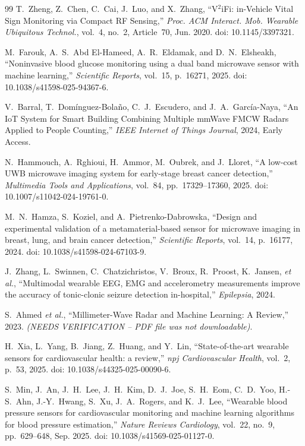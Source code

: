 \begin{thebibliography}{99}
T.~Zheng, Z.~Chen, C.~Cai, J.~Luo, and X.~Zhang, ``V$^2$iFi: in-Vehicle Vital Sign Monitoring via Compact RF Sensing,'' \textit{Proc. ACM Interact. Mob. Wearable Ubiquitous Technol.}, vol.~4, no.~2, Article~70, Jun. 2020. doi: 10.1145/3397321.

M.~Farouk, A.~S.~Abd El-Hameed, A.~R.~Eldamak, and D.~N.~Elsheakh, ``Noninvasive blood glucose monitoring using a dual band microwave sensor with machine learning,'' \textit{Scientific Reports}, vol.~15, p.~16271, 2025. doi: 10.1038/s41598-025-94367-6.

V.~Barral, T.~Dom\'{i}nguez-Bola\~{n}o, C.~J.~Escudero, and J.~A.~Garc\'{i}a-Naya, ``An IoT System for Smart Building Combining Multiple mmWave FMCW Radars Applied to People Counting,'' \textit{IEEE Internet of Things Journal}, 2024, Early Access.

N.~Hammouch, A.~Rghioui, H.~Ammor, M.~Oubrek, and J.~Lloret, ``A low-cost UWB microwave imaging system for early-stage breast cancer detection,'' \textit{Multimedia Tools and Applications}, vol.~84, pp.~17329--17360, 2025. doi: 10.1007/s11042-024-19761-0.

M.~N.~Hamza, S.~Koziel, and A.~Pietrenko-Dabrowska, ``Design and experimental validation of a metamaterial-based sensor for microwave imaging in breast, lung, and brain cancer detection,'' \textit{Scientific Reports}, vol.~14, p.~16177, 2024. doi: 10.1038/s41598-024-67103-9.

J.~Zhang, L.~Swinnen, C.~Chatzichristos, V.~Broux, R.~Proost, K.~Jansen, \textit{et al.}, ``Multimodal wearable EEG, EMG and accelerometry measurements improve the accuracy of tonic-clonic seizure detection in-hospital,'' \textit{Epilepsia}, 2024.

S.~Ahmed \textit{et al.}, ``Millimeter-Wave Radar and Machine Learning: A Review,'' 2023. \textit{(NEEDS VERIFICATION -- PDF file was not downloadable)}.

H.~Xia, L.~Yang, B.~Jiang, Z.~Huang, and Y.~Lin, ``State-of-the-art wearable sensors for cardiovascular health: a review,'' \textit{npj Cardiovascular Health}, vol.~2, p.~53, 2025. doi: 10.1038/s44325-025-00090-6.

S.~Min, J.~An, J.~H.~Lee, J.~H.~Kim, D.~J.~Joe, S.~H.~Eom, C.~D.~Yoo, H.-S.~Ahn, J.-Y.~Hwang, S.~Xu, J.~A.~Rogers, and K.~J.~Lee, ``Wearable blood pressure sensors for cardiovascular monitoring and machine learning algorithms for blood pressure estimation,'' \textit{Nature Reviews Cardiology}, vol.~22, no.~9, pp.~629--648, Sep. 2025. doi: 10.1038/s41569-025-01127-0.


\end{thebibliography}
